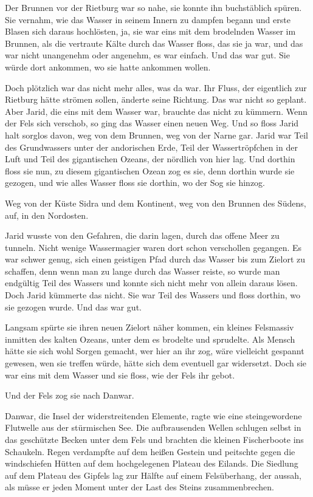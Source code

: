 Der Brunnen vor der Rietburg war so nahe, sie konnte ihn buchstäblich spüren. Sie vernahm, wie das Wasser in seinem Innern zu dampfen begann und erste Blasen sich daraus hochlösten, ja, sie war eins mit dem brodelnden Wasser im Brunnen, als die vertraute Kälte durch das Wasser floss, das sie ja war, und das war nicht unangenehm oder angenehm, es war einfach. Und das war gut. Sie würde dort ankommen, wo sie hatte ankommen wollen.

Doch plötzlich war das nicht mehr alles, was da war. Ihr Fluss, der eigentlich zur Rietburg hätte strömen sollen, änderte seine Richtung. Das war nicht so geplant. Aber Jarid, die eins mit dem Wasser war, brauchte das nicht zu kümmern. Wenn der Fels sich verschob, so ging das Wasser einen neuen Weg. Und so floss Jarid halt sorglos davon, weg von dem Brunnen, weg von der Narne gar. Jarid war Teil des Grundwassers unter der andorischen Erde, Teil der Wassertröpfchen in der Luft und Teil des gigantischen Ozeans, der nördlich von hier lag. Und dorthin floss sie nun, zu diesem gigantischen Ozean zog es sie, denn dorthin wurde sie gezogen, und wie alles Wasser floss sie dorthin, wo der Sog sie hinzog.

Weg von der Küste Sidra und dem Kontinent, weg von den Brunnen des Südens, auf, in den Nordosten.

Jarid wusste von den Gefahren, die darin lagen, durch das offene Meer zu tunneln. Nicht wenige Wassermagier waren dort schon verschollen gegangen. Es war schwer genug, sich einen geistigen Pfad durch das Wasser bis zum Zielort zu schaffen, denn wenn man zu lange durch das Wasser reiste, so wurde man endgültig Teil des Wassers und konnte sich nicht mehr von allein daraus lösen. Doch Jarid kümmerte das nicht. Sie war Teil des Wassers und floss dorthin, wo sie gezogen wurde. Und das war gut.

Langsam spürte sie ihren neuen Zielort näher kommen, ein kleines Felsmassiv inmitten des kalten Ozeans, unter dem es brodelte und sprudelte. Als Mensch hätte sie sich wohl Sorgen gemacht, wer hier an ihr zog, wäre vielleicht gespannt gewesen, wen sie treffen würde, hätte sich dem eventuell gar widersetzt. Doch sie war eins mit dem Wasser und sie floss, wie der Fels ihr gebot.

Und der Fels zog sie nach Danwar.

Danwar, die Insel der widerstreitenden Elemente, ragte wie eine steingewordene Flutwelle aus der stürmischen See. Die aufbrausenden Wellen schlugen selbst in das geschützte Becken unter dem Fels und brachten die kleinen Fischerboote ins Schaukeln. Regen verdampfte auf dem heißen Gestein und peitschte gegen die windschiefen Hütten auf dem hochgelegenen Plateau des Eilands. Die Siedlung auf dem Plateau des Gipfels lag zur Hälfte auf einem Felsüberhang, der aussah, als müsse er jeden Moment unter der Last des Steins zusammenbrechen.

